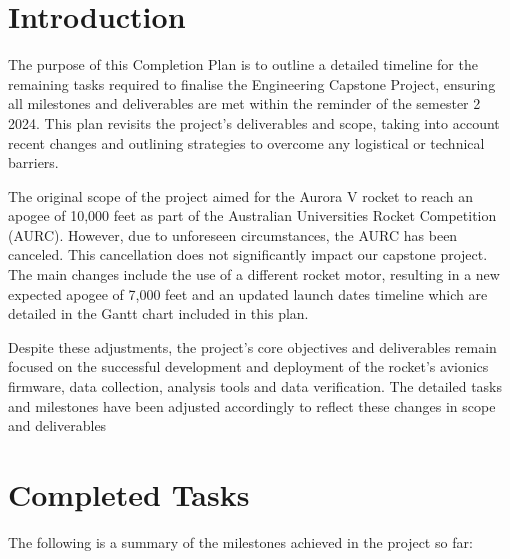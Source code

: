 
\section{Introduction}
The purpose of this Completion Plan is to outline a detailed timeline for the remaining tasks required to finalise the Engineering Capstone Project, ensuring all milestones and deliverables are met within the reminder of the semester 2 2024. This plan revisits the project's deliverables and scope, taking into account recent changes and outlining strategies to overcome any logistical or technical barriers.

The original scope of the project aimed for the Aurora V rocket to reach an apogee of 10,000 feet as part of the Australian Universities Rocket Competition (AURC). However, due to unforeseen circumstances, the AURC has been canceled. This cancellation does not significantly impact our capstone project. The main changes include the use of a different rocket motor, resulting in a new expected apogee of 7,000 feet and an updated launch dates timeline which are detailed in the Gantt chart included in this plan.

Despite these adjustments, the project's core objectives and deliverables remain focused on the successful development and deployment of the rocket's avionics firmware, data collection, analysis tools and data verification. The detailed tasks and milestones have been adjusted accordingly to reflect these changes in scope and deliverables

\section{Completed Tasks}
The following is a summary of the milestones achieved in the project so far:

